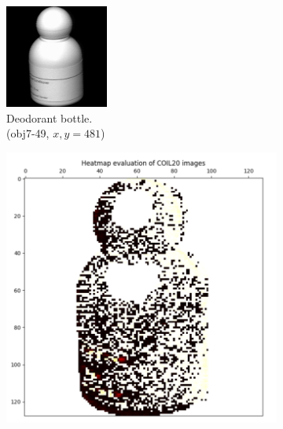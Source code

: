 \begin{figure}[!]
     \centering
     \begin{subfigure}[t]{0.32\columnwidth}
    	\centering
    	\includegraphics[width=\columnwidth]{images/coil-20-proc/obj7__49.png}
    	\caption{Deodorant bottle. \\ (obj7-49, $x,y=481$)}
        \label{fig:obj7__49}
    \end{subfigure}
     \hfill
     \begin{subfigure}[t]{0.32\columnwidth}
    	\centering
    	\includegraphics[width=\columnwidth]{images/heatmap_coil20_best.png}

\end{subfigure}
\end{figure}

